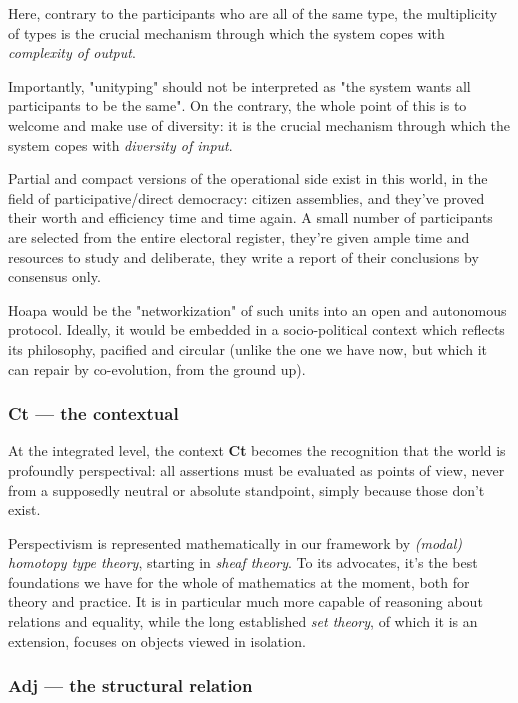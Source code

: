 \documentclass[11pt]{article}
\begin{document}
Here, contrary to the participants who are all of the same type, the multiplicity of types is the crucial mechanism through which the system copes with \emph{complexity of output}.

Importantly, "unityping" should not be interpreted as "the system wants all participants to be the same". On the contrary, the whole point of this is to welcome and make use of diversity: it is the crucial mechanism through which the system copes with \emph{diversity of input}.

Partial and compact versions of the operational side exist in this world, in the field of participative/direct democracy: citizen assemblies, and they've proved their worth and efficiency time and time again. A small number of participants are selected from the entire electoral register, they're given ample time and resources to study and deliberate, they write a report of their conclusions by consensus only.

Hoapa would be the "networkization" of such units into an open and autonomous protocol. Ideally, it would be embedded in a socio-political context which reflects its philosophy, pacified and circular (unlike the one we have now, but which it can repair by co-evolution, from the ground up).

\subsubsection{Ct --- the contextual}

At the integrated level, the context \textbf{Ct} becomes the recognition that the world is profoundly perspectival: all assertions must be evaluated as points of view, never from a supposedly neutral or absolute standpoint, simply because those don't exist.

Perspectivism is represented mathematically in our framework by \emph{(modal) homotopy type theory}, starting in \emph{sheaf theory}. To its advocates, it's the best foundations we have for the whole of mathematics at the moment, both for theory and practice. It is in particular much more capable of reasoning about relations and equality, while the long established \emph{set theory}, of which it is an extension, focuses on objects viewed in isolation.

\subsubsection{Adj --- the structural relation}
\end{document}
